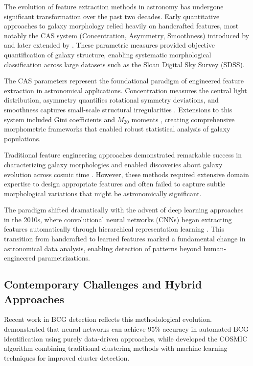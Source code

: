 \documentclass[twocolumn,10pt]{aastex631}
\begin{document}
The evolution of feature extraction methods in astronomy has undergone significant transformation over the past two decades. Early quantitative approaches to galaxy morphology relied heavily on handcrafted features, most notably the CAS system (Concentration, Asymmetry, Smoothness) introduced by \citet{Abraham1996} and later extended by \citet{Conselice2003}. These parametric measures provided objective quantification of galaxy structure, enabling systematic morphological classification across large datasets such as the Sloan Digital Sky Survey (SDSS).

The CAS parameters represent the foundational paradigm of engineered feature extraction in astronomical applications. Concentration measures the central light distribution, asymmetry quantifies rotational symmetry deviations, and smoothness captures small-scale structural irregularities \citep{Conselice2003}. Extensions to this system included Gini coefficients and $M_{20}$ moments \citep{Hambleton2011}, creating comprehensive morphometric frameworks that enabled robust statistical analysis of galaxy populations.

Traditional feature engineering approaches demonstrated remarkable success in characterizing galaxy morphologies and enabled discoveries about galaxy evolution across cosmic time \citep{Conselice2014}. However, these methods required extensive domain expertise to design appropriate features and often failed to capture subtle morphological variations that might be astronomically significant.

The paradigm shifted dramatically with the advent of deep learning approaches in the 2010s, where convolutional neural networks (CNNs) began extracting features automatically through hierarchical representation learning \citep{Dieleman2015}. This transition from handcrafted to learned features marked a fundamental change in astronomical data analysis, enabling detection of patterns beyond human-engineered parametrizations.

\subsection{Contemporary Challenges and Hybrid Approaches}

Recent work in BCG detection reflects this methodological evolution. \citet{Janulewicz2025BCG} demonstrated that neural networks can achieve 95\% accuracy in automated BCG identification using purely data-driven approaches, while \citet{COSMIC2024} developed the COSMIC algorithm combining traditional clustering methods with machine learning techniques for improved cluster detection.
\end{document}
